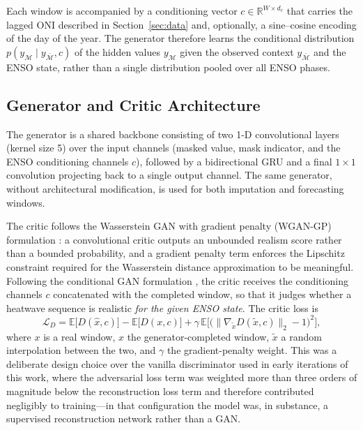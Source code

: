 \documentclass[conference]{IEEEtran}
\begin{document}
Each window is accompanied by a conditioning vector $c \in \mathbb{R}^{W \times d_c}$ that carries the
lagged ONI described in Section~\ref{sec:data} and, optionally, a sine--cosine encoding of the day of
the year. The generator therefore learns the conditional distribution
$p(y_{\mathcal{M}} \mid y_{\bar{\mathcal{M}}}, c)$ of the hidden values $y_{\mathcal{M}}$ given the
observed context $y_{\bar{\mathcal{M}}}$ and the ENSO state, rather than a single distribution pooled
over all ENSO phases.

\subsection{Generator and Critic Architecture}

The generator is a shared backbone consisting of two 1-D convolutional layers (kernel size 5) over the
input channels (masked value, mask indicator, and the ENSO conditioning channels $c$), followed by a
bidirectional GRU and a final $1\times1$ convolution projecting back to a single output channel. The
same generator, without architectural modification, is used for both imputation and forecasting
windows.

The critic follows the Wasserstein GAN with gradient penalty (WGAN-GP) formulation
\cite{arjovsky2017wasserstein,gulrajani2017improved}: a convolutional critic outputs an unbounded
realism score rather than a bounded probability, and a gradient penalty term enforces the Lipschitz
constraint required for the Wasserstein distance approximation to be meaningful. Following the
conditional GAN formulation \cite{mirza2014conditional}, the critic receives the conditioning channels
$c$ concatenated with the completed window, so that it judges whether a heatwave sequence is realistic
\emph{for the given ENSO state}. The critic loss is
\begin{equation}
\mathcal{L}_D = \mathbb{E}\big[D(\hat{x}, c)\big] - \mathbb{E}\big[D(x, c)\big]
+ \gamma\, \mathbb{E}\Big[\big(\lVert \nabla_{\tilde{x}} D(\tilde{x}, c) \rVert_2 - 1\big)^2\Big],
\label{eq:critic}
\end{equation}
where $x$ is a real window, $\hat{x}$ the generator-completed window, $\tilde{x}$ a random
interpolation between the two, and $\gamma$ the gradient-penalty weight. This was a deliberate design
choice over the vanilla discriminator used in early iterations of this work, where the adversarial loss
term was weighted more than three orders of magnitude below the reconstruction loss term and therefore
contributed negligibly to training---in that configuration the model was, in substance, a supervised
reconstruction network rather than a GAN.
\end{document}
